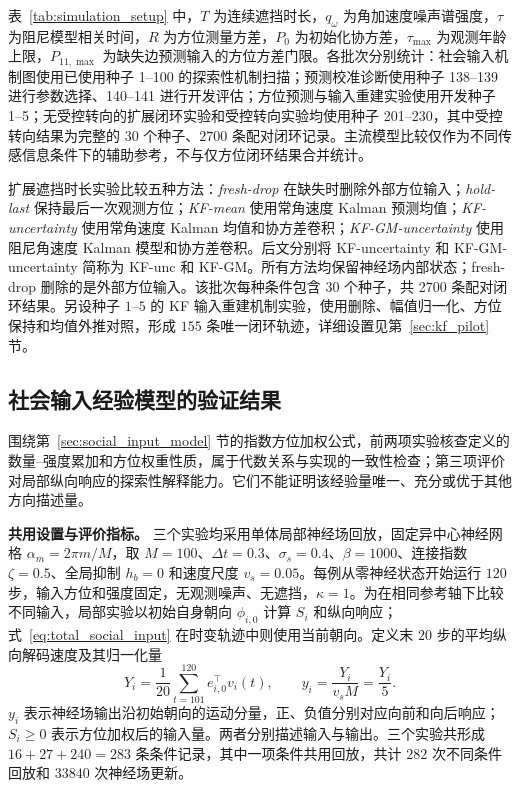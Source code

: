 \documentclass[UTF8,fontset=windows,11pt]{ctexart}
\begin{document}
表~\ref{tab:simulation_setup} 中，$T$ 为连续遮挡时长，$q_\omega$ 为角加速度噪声谱强度，$\tau$ 为阻尼模型相关时间，$R$ 为方位测量方差，$P_0$ 为初始化协方差，$\tau_{\max}$ 为观测年龄上限，$P_{11,\max}$ 为缺失边预测输入的方位方差门限。各批次分别统计：社会输入机制图使用已使用种子 1--100 的探索性机制扫描；预测校准诊断使用种子 138--139 进行参数选择、140--141 进行开发评估；方位预测与输入重建实验使用开发种子 1--5；无受控转向的扩展闭环实验和受控转向实验均使用种子 201--230，其中受控转向结果为完整的 $30$ 个种子、$2700$ 条配对闭环记录。主流模型比较仅作为不同传感信息条件下的辅助参考，不与仅方位闭环结果合并统计。

扩展遮挡时长实验比较五种方法：\textit{fresh-drop} 在缺失时删除外部方位输入；\textit{hold-last} 保持最后一次观测方位；\textit{KF-mean} 使用常角速度 Kalman 预测均值；\textit{KF-uncertainty} 使用常角速度 Kalman 均值和协方差卷积；\textit{KF-GM-uncertainty} 使用阻尼角速度 Kalman 模型和协方差卷积。后文分别将 KF-uncertainty 和 KF-GM-uncertainty 简称为 KF-unc 和 KF-GM。所有方法均保留神经场内部状态；fresh-drop 删除的是外部方位输入。该批次每种条件包含 30 个种子，共 2700 条配对闭环结果。另设种子 $1$--$5$ 的 KF 输入重建机制实验，使用删除、幅值归一化、方位保持和均值外推对照，形成 $155$ 条唯一闭环轨迹，详细设置见第~\ref{sec:kf_pilot} 节。


\subsection{社会输入经验模型的验证结果}
\label{sec:social_input_validation}

围绕第~\ref{sec:social_input_model} 节的指数方位加权公式，前两项实验核查定义的数量--强度累加和方位权重性质，属于代数关系与实现的一致性检查；第三项评价对局部纵向响应的探索性解释能力。它们不能证明该经验量唯一、充分或优于其他方向描述量。

\textbf{共用设置与评价指标。} 三个实验均采用单体局部神经场回放，固定异中心神经网格 $\alpha_m=2\pi m/M$，取 $M=100$、$\Delta t=0.3$、$\sigma_s=0.4$、$\beta=1000$、连接指数 $\zeta=0.5$、全局抑制 $h_b=0$ 和速度尺度 $v_s=0.05$。每例从零神经状态开始运行 $120$ 步，输入方位和强度固定，无观测噪声、无遮挡，$\kappa=1$。为在相同参考轴下比较不同输入，局部实验以初始自身朝向 $\phi_{i,0}$ 计算 $S_i$ 和纵向响应；式~\eqref{eq:total_social_input} 在时变轨迹中则使用当前朝向。定义末 $20$ 步的平均纵向解码速度及其归一化量
\begin{equation}
 Y_i=\frac{1}{20}\sum_{t=101}^{120}e_{i,0}^{\top}v_i(t),
 \qquad y_i=\frac{Y_i}{v_sM}=\frac{Y_i}{5}.
 \label{eq:local_response}
\end{equation}
$y_i$ 表示神经场输出沿初始朝向的运动分量，正、负值分别对应向前和向后响应；$S_i\geq0$ 表示方位加权后的输入量。两者分别描述输入与输出。三个实验共形成 $16+27+240=283$ 条条件记录，其中一项条件共用回放，共计 $282$ 次不同条件回放和 $33840$ 次神经场更新。
\end{document}
